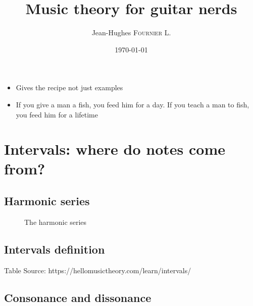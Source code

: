 \documentclass{article}
\title{ Music theory for guitar nerds  } %
\author{ Jean-Hughes \textsc{Fournier L.} } %
\date{\today} %
\begin{document}
\maketitle %
\newpage
\tableofcontents
\newpage

\begin{itemize}
	\item Gives the recipe not just examples
	\item If you give a man a fish, you feed him for a day. If you teach a man to fish, you feed him for a lifetime
\end{itemize}

\section{Intervals: where do notes come from?}


\subsection{Harmonic series}

\begin{figure}[h!]
	\centering
	\scalebox{1}{}
	\caption{The harmonic series}
	\label{fig:serie_harmonique}
\end{figure}

\subsection{Intervals definition}



 Table
 Source: https://hellomusictheory.com/learn/intervals/



\subsection{Consonance and dissonance}
\end{document}
